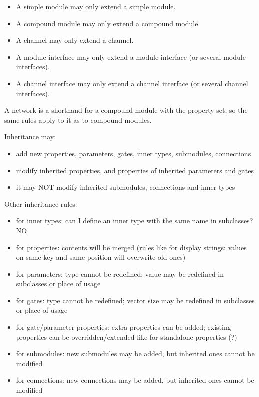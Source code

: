 \begin{itemize}
  \item A simple module may only extend a simple module.
  \item A compound module may only extend a compound module.
  \item A channel may only extend a channel.
  \item A module interface may only extend a module interface (or several module
        interfaces).
  \item A channel interface may only extend a channel interface (or several
        channel interfaces).
\end{itemize}

A network is a shorthand for a compound module with the 
property set, so the same rules apply to it as to compound modules.

Inheritance may:
\begin{itemize}
    \item add new properties, parameters, gates, inner types, submodules,
          connections
    \item modify inherited properties, and properties of inherited parameters and
          gates
    \item it may NOT modify inherited submodules, connections and inner types
\end{itemize}

Other inheritance rules:
\begin{itemize}
    \item  for inner types:
       can I define an inner type with the same name in subclasses? NO
    \item  for properties:
       contents will be merged (rules like for display strings: values on
       same key and same position will overwrite old ones)
    \item for parameters:
       type cannot be redefined;
       value may be redefined in subclasses or place of usage
    \item  for gates:
       type cannot be redefined;
       vector size may be redefined in subclasses or place of usage
    \item  for gate/parameter properties:
       extra properties can be added;
       existing properties can be overridden/extended like for standalone properties (?)
    \item  for submodules:
       new submodules may be added, but inherited ones cannot be modified
    \item  for connections:
       new connections may be added, but inherited ones cannot be modified
\end{itemize}

